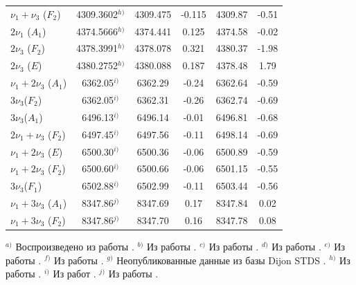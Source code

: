 \begin{longtable}{lccccc}
$\nu_1+\nu_3$ ($F_2$) & 4309.3602$^{h)}$ & 4309.475 & -0.115 & 4309.87 & -0.51 \\
$2\nu_1$ ($A_1$) & 4374.5666$^{h)}$ & 4374.441 & 0.125 & 4374.58 & -0.02 \\
$2\nu_3$ ($F_2$) & 4378.3991$^{h)}$ & 4378.078 & 0.321 & 4380.37 & -1.98 \\
$2\nu_3$ ($E  $) & 4380.2752$^{h)}$ & 4380.088 & 0.187 & 4378.48 & 1.79 \\
$\nu_1+2\nu_3$ ($A_1$) & 6362.05$^{i)}$ & 6362.29 & -0.24 & 6362.64 & -0.59 \\
$3\nu_3$($F_2$) & 6362.05$^{i)}$ & 6362.31 & -0.26 & 6362.74 & -0.69 \\
$3\nu_3$($A_1$) & 6496.13$^{i)}$ & 6496.14 & -0.01 & 6496.81 & -0.68 \\
$2\nu_1+\nu_3$ ($F_2$) & 6497.45$^{i)}$ & 6497.56 & -0.11 & 6498.14 & -0.69 \\
$\nu_1+2\nu_3$ ($E  $) & 6500.30$^{i)}$ & 6500.36 & -0.06 & 6500.89 & -0.59 \\
$\nu_1+2\nu_3$ ($F_2$) & 6500.60$^{i)}$ & 6500.66 & -0.06 & 6501.15 & -0.55 \\
$3\nu_3$($F_1$) & 6502.88$^{i)}$ & 6502.99 & -0.11 & 6503.44 & -0.56 \\
$\nu_1+3\nu_3$ ($A_1$) & 8347.86$^{j)}$ & 8347.69 & 0.17 & 8347.84 & 0.02 \\
$\nu_1+3\nu_3$ ($F_2$) & 8347.86$^{j)}$ & 8347.70 & 0.16 & 8347.78 & 0.08 \\
\end{longtable}

\vspace{0.5ex}
\begin{minipage}{0.95\textwidth}
\scriptsize
$^{a)}$ Воспроизведено из работы \cite{wang}.\quad
$^{b)}$ Из работы \cite{4302}.\quad
$^{c)}$ Из работы \cite{4303}.\quad
$^{d)}$ Из работы \cite{4301}.\quad
$^{e)}$ Из работы \cite{5312}.\quad
$^{f)}$ Из работы \cite{4312}.\quad
$^{g)}$ Неопубликованные данные из базы Dijon STDS \cite{dijon}.\quad
$^{h)}$ Из работы \cite{4300}.\quad
$^{i)}$ Из работ \cite{zhu2,zhu3}.\quad
$^{j)}$ Из работы \cite{chegl}. 
\end{minipage}

\endgroup
